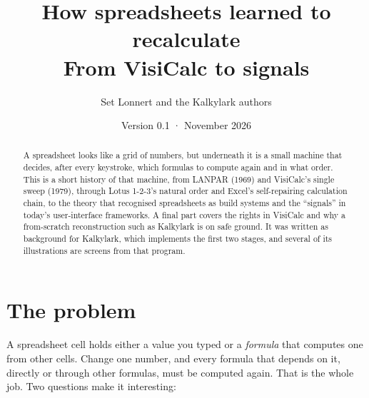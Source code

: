 \documentclass[11pt]{article}
\title{\sffamily\bfseries\color{ink}How spreadsheets learned to recalculate\\[4pt]
  \Large\mdseries From VisiCalc to signals}
\author{\sffamily Set Lonnert and the Kalkylark authors}
\date{\sffamily Version 0.1 · November 2026}
\begin{document}
\maketitle
\thispagestyle{empty}

\begin{abstract}
\noindent A spreadsheet looks like a grid of numbers, but underneath it is
a small machine that decides, after every keystroke, which formulas to
compute again and in what order. This is a short history of that machine,
from LANPAR (1969) and VisiCalc's single sweep (1979), through Lotus
1-2-3's natural order and Excel's self-repairing calculation chain, to the
theory that recognised spreadsheets as build systems and the ``signals'' in
today's user-interface frameworks. A final part covers the rights in
VisiCalc and why a from-scratch reconstruction such as Kalkylark is on safe
ground. It was written as background for Kalkylark, which implements the
first two stages, and several of its illustrations are screens from that
program.
\end{abstract}

\vspace{1em}
\begin{center}
\end{center}

\newpage
\tableofcontents
\newpage

\section{The problem}

A spreadsheet cell holds either a value you typed or a \emph{formula} that
computes one from other cells. Change one number, and every formula that
depends on it, directly or through other formulas, must be computed again.
That is the whole job. Two questions make it interesting:
\end{document}
